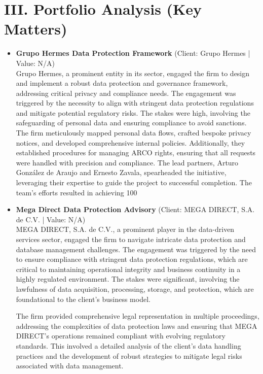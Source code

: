 \documentclass[11pt]{article}
\begin{document}
\section*{III. Portfolio Analysis (Key Matters)}
\begin{itemize}
\item \textbf{Grupo Hermes Data Protection Framework} (Client: Grupo Hermes | Value: N/A)\\ Grupo Hermes, a prominent entity in its sector, engaged the firm to design and implement a robust data protection and governance framework, addressing critical privacy and compliance needs. The engagement was triggered by the necessity to align with stringent data protection regulations and mitigate potential regulatory risks. The stakes were high, involving the safeguarding of personal data and ensuring compliance to avoid sanctions. The firm meticulously mapped personal data flows, crafted bespoke privacy notices, and developed comprehensive internal policies. Additionally, they established procedures for managing ARCO rights, ensuring that all requests were handled with precision and compliance. The lead partners, Arturo González de Araujo and Ernesto Zavala, spearheaded the initiative, leveraging their expertise to guide the project to successful completion. The team’s efforts resulted in achieving 100%
\item \textbf{Mega Direct Data Protection Advisory} (Client: MEGA DIRECT, S.A. de C.V. | Value: N/A)\\ MEGA DIRECT, S.A. de C.V., a prominent player in the data-driven services sector, engaged the firm to navigate intricate data protection and database management challenges. The engagement was triggered by the need to ensure compliance with stringent data protection regulations, which are critical to maintaining operational integrity and business continuity in a highly regulated environment. The stakes were significant, involving the lawfulness of data acquisition, processing, storage, and protection, which are foundational to the client's business model. 

The firm provided comprehensive legal representation in multiple proceedings, addressing the complexities of data protection laws and ensuring that MEGA DIRECT's operations remained compliant with evolving regulatory standards. This involved a detailed analysis of the client's data handling practices and the development of robust strategies to mitigate legal risks associated with data management. 


\end{itemize}
\end{document}
